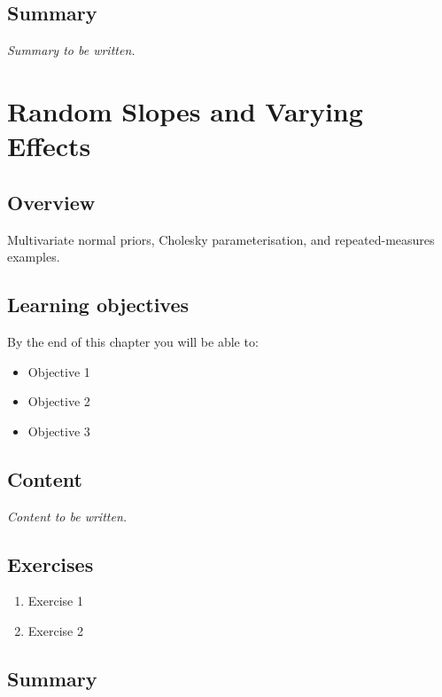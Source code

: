\documentclass[
  11pt,
  a4paper,
  oneside,
  openany]{scrbook}
\providecommand{\tightlist}{%
  \setlength{\itemsep}{0pt}\setlength{\parskip}{0pt}}\usepackage{longtable,booktabs,array}
\begin{document}
\section{Summary}\label{summary-7}

\emph{Summary to be written.}

\chapter{Random Slopes and Varying
Effects}\label{random-slopes-and-varying-effects}

\section{Overview}\label{overview-8}

Multivariate normal priors, Cholesky parameterisation, and
repeated-measures examples.

\section{Learning objectives}\label{learning-objectives-8}

By the end of this chapter you will be able to:

\begin{itemize}
\tightlist
\item[$\square$]
  Objective 1
\item[$\square$]
  Objective 2
\item[$\square$]
  Objective 3
\end{itemize}

\section{Content}\label{content-7}

\emph{Content to be written.}

\section{Exercises}\label{exercises-8}

\begin{enumerate}
\def\labelenumi{\arabic{enumi}.}
\tightlist
\item
  Exercise 1
\item
  Exercise 2
\end{enumerate}

\section{Summary}\label{summary-8}
\end{document}
